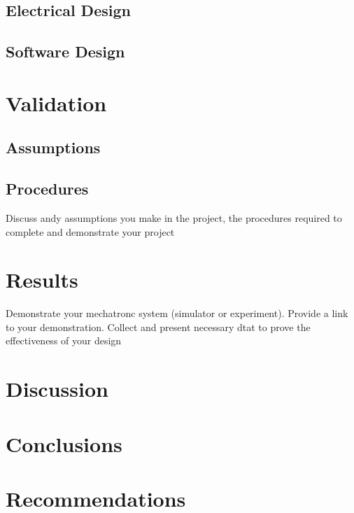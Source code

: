 \documentclass[12pt, letterpaper,titlepage]{article}
\begin{document}
\subsection{Electrical Design}

\subsection{Software Design}

\section{Validation}

\subsection{Assumptions}

\subsection{Procedures}
	Discuss andy assumptions you make in the project, the procedures required to complete and demonstrate your project

\section{Results}
	Demonstrate your mechatronc system (simulator or experiment). Provide a link to your demonstration. Collect and present necessary dtat to prove the effectiveness of your design

\section{Discussion}

\section{Conclusions}

\section{Recommendations}



\end{document}
